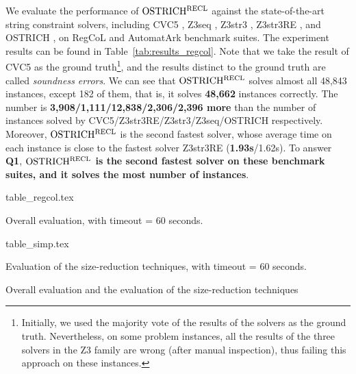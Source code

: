 We evaluate the performance of $\rm OSTRICH^{RECL}$ against the state-of-the-art string constraint solvers, including CVC5
\cite{cvc5}, Z3seq \cite{z3seq}, Z3str3
\cite{z3str3}, Z3str3RE \cite{z3str3re}, and OSTRICH
\cite{ostrich2023}, on RegCoL and AutomatArk benchmark suites.
The experiment results can be found in Table~\ref{tab:results_regcol}. Note that we take the result of CVC5 as the ground truth\footnote{Initially,  we used the majority vote of the results of the solvers as the ground truth. Nevertheless, on some problem instances, all the results of the three solvers in the Z3 family are wrong (after manual inspection), thus failing this approach on these instances.}, and the results distinct to the ground truth are called \emph{soundness errors}. We can see that $\rm OSTRICH^{RECL}$ solves almost all 48,843 instances, except 182 of them, that is, it solves \textbf{48,662} instances correctly. The number is \textbf{3,908/1,111/12,838/2,306/2,396 more} than the number of instances solved by CVC5/Z3str3RE/Z3str3/Z3seq/OSTRICH respectively.
%
Moreover, $\rm OSTRICH^{RECL}$ is the second fastest solver, whose average time on each instance is close to the fastest solver Z3str3RE (\textbf{1.93s}/1.62s). To answer \textbf{Q1}, \textbf{$\rm OSTRICH^{RECL}$ is the second fastest solver on these benchmark suites, and it solves the most number of instances}.

%
\begin{table}
  \centering
  \begin{subtable}{0.513\textwidth}
      \centering
      {table_regcol.tex}
      \caption{Overall evaluation, with timeout = 60 seconds.}
      \label{tab:results_regcol}
  \end{subtable}
  \begin{subtable}{0.477\textwidth}
      \centering
      {table_simp.tex}
      \caption{Evaluation of the size-reduction techniques, with timeout = 60 seconds.}
      \label{tab:results_simp}
  \end{subtable}
  \caption{Overall evaluation and the evaluation of the size-reduction techniques}
\end{table}

